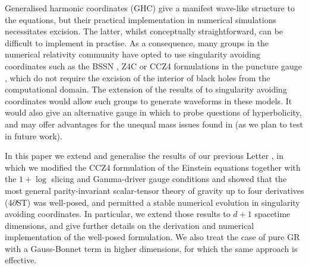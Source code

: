\documentclass[reprint,aps,amsmath,amssymb,twoside,prd,showkeys,superscriptaddress,nofootinbib]{revtex4-2}
\begin{document}
Generalised harmonic coordinates (GHC) give a manifest wave-like structure to the equations, but their practical implementation in numerical simulations necessitates excision. The latter, whilst conceptually straightforward, can be difficult to implement in practise. As a consequence,  many groups in the numerical relativity community have opted to use singularity avoiding coordinates such as the BSSN \cite{Nakamura:1987zz,Shibata:1995we,Baumgarte:1998te}, Z4C \cite{Bona:2003fj,Bernuzzi:2009ex} or CCZ4 \cite{Alic:2011gg,Alic:2013xsa} formulations in the puncture gauge \cite{Campanelli:2005dd,Baker:2005vv}, which do not require the excision of the interior of black holes from the computational domain. The extension of the results of \cite{Kovacs:2020pns,Kovacs:2020ywu} to singularity avoiding coordinates would allow such groups to generate waveforms in these models. It would also give an alternative gauge in which to probe questions of hyperbolicity, and may offer advantages for the unequal mass issues found in \cite{Corman:2022xqg} (as we plan to test in future work).

In this paper we extend and generalise the results of our previous Letter \cite{AresteSalo:2022hua}, in which we modified the CCZ4 formulation of the Einstein equations together with the $1+\log$ slicing \cite{Bona:1994dr} and Gamma-driver \cite{Alcubierre:2002kk} gauge conditions and showed that the most general parity-invariant scalar-tensor theory of gravity up to four derivatives (4$\partial$ST) was well-posed, and permitted a stable numerical evolution in singularity avoiding coordinates.
In particular, we extend those results to $d+1$ spacetime dimensions, and give further details on the derivation and numerical implementation of the well-posed formulation. We also treat the case of pure GR with a Gauss-Bonnet term in higher dimensions, for which the same approach is effective.
\end{document}
